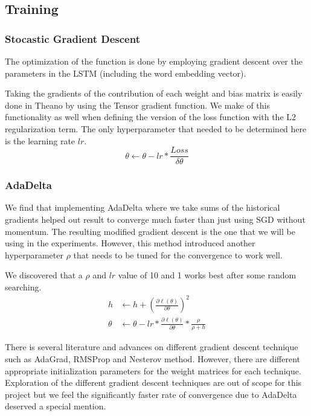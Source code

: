 \documentclass[fyp]{socreport}
\begin{document}
\subsection{Training}

\subsubsection{Stocastic Gradient Descent} The optimization of the function is
done by employing gradient descent over the parameters in the LSTM (including
the word embedding vector).

Taking the gradients of the contribution of each weight and bias matrix is
easily done in Theano by using the Tensor gradient function. We make of this
functionality as well when defining the version of the loss function with the
L2 regularization term. The only hyperparameter that needed to be determined
here is the learning rate $lr$.
\begin{equation}
  \theta \leftarrow \theta - lr * \frac{Loss}{\delta \theta}
\end{equation}

\subsubsection{AdaDelta} We find that implementing AdaDelta where we take sums
of the historical gradients helped out result to converge much faster than just
using SGD without momentum. The resulting modified gradient descent is the one
that we will be using in the experiments. However, this method introduced another
hyperparameter $\rho$ that needs to be tuned for the convergence to work well.

We discovered that a $\rho$ and $lr$ value of 10 and 1 works best after some
random searching.
\begin{align*}
  h &\leftarrow h + \left( \frac{\partial \ell(\theta)}{\partial \theta} \right)^2 \\
  \theta &\leftarrow \theta - lr * \frac{\partial \ell(\theta)}{\partial \theta}
  * \frac{\rho}{\rho + h}
\end{align*}

There is several literature and advances on different gradient descent
technique such as AdaGrad, RMSProp and Nesterov method.  However, there are
different appropriate initialization parameters for the weight matrices for
each technique.  Exploration of the different gradient descent techniques
are out of scope for this project but we feel the significantly faster rate of
convergence due to AdaDelta deserved a special mention.
\end{document}
